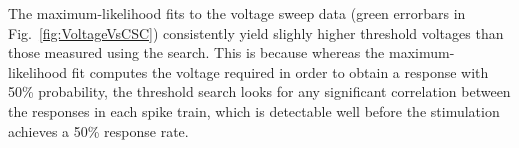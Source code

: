 \documentclass[10pt,letterpaper]{article}
\newcommand\fig[1]{Fig.~\ref{#1}}
\newcommand{\noprint}[1]{}
\begin{document}
The maximum-likelihood fits to the voltage sweep data (green errorbars in \fig{fig:VoltageVsCSC}) consistently yield slighly higher threshold voltages than those measured using the search.  This is because whereas the maximum-likelihood fit computes the voltage required in order to obtain a response with 50\% probability, the threshold search looks for any significant correlation between the responses in each spike train, which is detectable well before the stimulation achieves a 50\% response rate.

\noprint{FIXME: The following caveat doesn't apply to lw95rhp-2015-12-04: Each threshold scan terminated when a stimulation voltage over 3 V was detected, so for some datasets (e.g. lw95rhp-2015-12-09) we were unable to acquire all five measurements for some CSCs, and thus they are worse than the figure shows.}  
\end{document}
